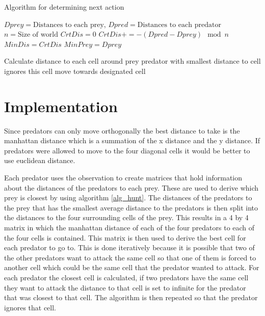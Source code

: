\documentclass[10pt]{article}
\begin{document}
\begin{algorithm}
\caption{Algorithm for determining next action}
\label{alg_hunt}
	\begin{algorithmic}
\REQUIRE $Dprey=\textrm{Distances to each prey}$, $Dpred=\textrm{Distances to each predator}$
\STATE $n=\textrm{Size of world}$
\STATE {}
\STATE $CrtDis=0$
\STATE $CrtDis += -(Dpred-Dprey)\mod n$
\ENDFOR
{}
\STATE $MinDis=CrtDis$
\STATE $MinPrey = Dprey$
\ENDIF
\ENDFOR

\STATE {}
\STATE Calculate distance to each cell around prey
\STATE predator with smallest distance to cell ignores this cell
\ENDIF
\ENDFOR
\STATE move towards designated cell
\end{algorithmic}
\end{algorithm}


\section{Implementation}\label{implementation}
Since predators can only move orthogonally the best distance to take is the manhattan distance which is a summation of the x distance and the y distance. If predators were allowed to move to the four diagonal cells it would be better to use euclidean distance. 

Each predator uses the observation to create matrices that hold information about the distances of the predators to each prey. These are used to derive which prey is closest by using algorithm \ref{alg_hunt}. The distances of the predators to the prey that has the smallest average distance to the predators is then split into the distances to the four surrounding cells of the prey. This results in a 4 by 4 matrix in which the manhattan distance of each of the four predators to each of the four cells is contained. This matrix is then used to derive the best cell for each predator to go to. This is done iteratively because it is possible that two of the other predators want to attack the same cell so that one of them is forced to another cell which could be the same cell that the predator wanted to attack. For each predator the closest cell is calculated, if two predators have the same cell they want to attack the distance to that cell is set to infinite for the predator that was closest to that cell. The algorithm is then repeated so that the predator ignores that cell.
\end{document}
